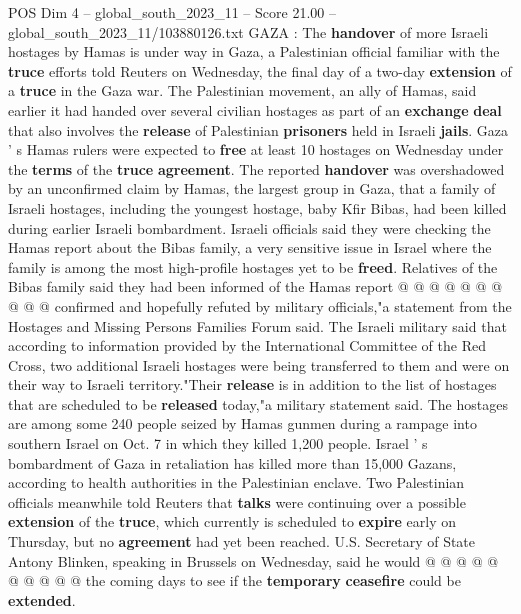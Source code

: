 \begin{textsample}{POS Dim 4 – global\_south\_2023\_11 – Score 21.00 – global\_south\_2023\_11/103880126.txt}  \label{ex:f4_pos_164}
GAZA : The \textbf{handover} of more Israeli hostages by Hamas is under way in Gaza, a Palestinian official familiar with the \textbf{truce} efforts told Reuters on Wednesday, the final day of a two-day \textbf{extension} of a \textbf{truce} in the Gaza war.
The Palestinian movement, an ally of Hamas, said earlier it had handed over several civilian hostages as part of an \textbf{exchange} \textbf{deal} that also involves the \textbf{release} of Palestinian \textbf{prisoners} held in Israeli \textbf{jails}.
Gaza ' s Hamas rulers were expected to \textbf{free} at least 10 hostages on Wednesday under the \textbf{terms} of the \textbf{truce} \textbf{agreement}.
The reported \textbf{handover} was overshadowed by an unconfirmed claim by Hamas, the largest group in Gaza, that a family of Israeli hostages, including the youngest hostage, baby Kfir Bibas, had been killed during earlier Israeli bombardment.
Israeli officials said they were checking the Hamas report about the Bibas family, a very sensitive issue in Israel where the family is among the most high-profile hostages yet to be \textbf{freed}.
Relatives of the Bibas family said they had been informed of the Hamas report @ @ @ @ @ @ @ @ @ @ confirmed and hopefully refuted by military officials,"a statement from the Hostages and Missing Persons Families Forum said.
The Israeli military said that according to information provided by the International Committee of the Red Cross, two additional Israeli hostages were being transferred to them and were on their way to Israeli territory."Their \textbf{release} is in addition to the list of hostages that are scheduled to be \textbf{released} today,"a military statement said.
The hostages are among some 240 people seized by Hamas gunmen during a rampage into southern Israel on Oct. 7 in which they killed 1,200 people.
Israel ' s bombardment of Gaza in retaliation has killed more than 15,000 Gazans, according to health authorities in the Palestinian enclave.
Two Palestinian officials meanwhile told Reuters that \textbf{talks} were continuing over a possible \textbf{extension} of the \textbf{truce}, which currently is scheduled to \textbf{expire} early on Thursday, but no \textbf{agreement} had yet been reached.
U.S.
Secretary of State Antony Blinken, speaking in Brussels on Wednesday, said he would @ @ @ @ @ @ @ @ @ @ the coming days to see if the \textbf{temporary} \textbf{ceasefire} could be \textbf{extended}.

\end{textsample}
